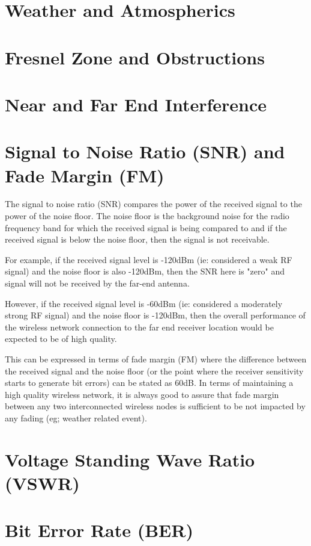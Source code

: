 \section{Weather and Atmospherics}



\section{Fresnel Zone and Obstructions}



\section{Near and Far End Interference}



\section{Signal to Noise Ratio (SNR) and Fade Margin (FM)}
The signal to noise ratio (SNR) compares the power of the received signal to the power of the noise floor.  The noise floor is the background noise for the radio frequency band for which the received signal is being compared to and if the received signal is below the noise floor, then the signal is not receivable.  

For example, if the received signal level is -120dBm (ie: considered a weak RF signal) and the noise floor is also -120dBm, then the SNR here is "zero" and signal will not be received by the far-end antenna.

However, if the received signal level is -60dBm (ie: considered a moderately strong RF signal) and the noise floor is -120dBm, then the overall performance of the wireless network connection to the far end receiver location would be expected to be of high quality.  

This can be expressed in terms of fade margin (FM) where the difference between the received signal and the noise floor (or the point where the receiver sensitivity starts to generate bit errors) can be stated as 60dB. In terms of maintaining a high quality wireless network, it is always good to assure that fade margin between any two interconnected wireless nodes is sufficient to be not impacted by any fading (eg; weather related event). 


\section{Voltage Standing Wave Ratio (VSWR)}



\section{Bit Error Rate (BER)}

